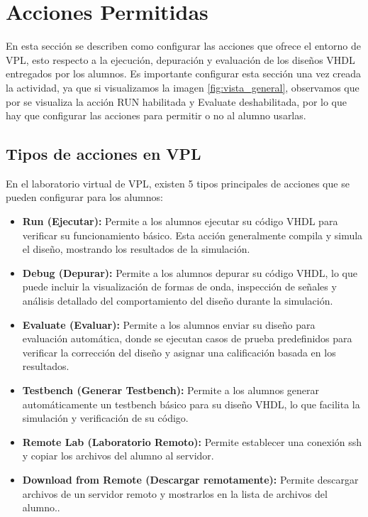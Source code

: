\documentclass[12pt, a4paper, twoside, openany]{book}
\begin{document}
\chapter{Acciones Permitidas}
\label{ch:acciones}
En esta sección se describen como configurar las acciones que ofrece el entorno de VPL, esto respecto a la ejecución, depuración y evaluación de los diseños VHDL entregados por los alumnos.
Es importante configurar esta sección una vez creada la actividad, ya que si visualizamos la imagen \ref{fig:vista_general}, observamos que por se visualiza la acción  RUN habilitada y Evaluate deshabilitada, 
por lo que hay que configurar las  acciones para permitir o no al alumno usarlas.

\section{Tipos de acciones en VPL}
\label{sec:tipos-acciones}
En el laboratorio virtual de VPL, existen 5 tipos principales de acciones  que se pueden configurar para los alumnos:
\begin{itemize}
  \item \textbf{Run (Ejecutar):} Permite a los alumnos ejecutar su código VHDL para verificar su funcionamiento básico. Esta acción generalmente compila y simula el diseño, mostrando los resultados de la simulación.
  \item \textbf{Debug (Depurar):} Permite a los alumnos depurar su código VHDL, lo que puede incluir la visualización de formas de onda, inspección de señales y análisis detallado del comportamiento del diseño durante la simulación.
  \item \textbf{Evaluate (Evaluar):} Permite a los alumnos enviar su diseño para evaluación automática, donde se ejecutan casos de prueba predefinidos para verificar la corrección del diseño y asignar una calificación basada en los resultados. 
  \item \textbf{Testbench (Generar Testbench):} Permite a los alumnos generar automáticamente un testbench básico para su diseño VHDL, lo que facilita la simulación y verificación de su código.
  \item  \textbf{Remote Lab (Laboratorio Remoto):} Permite establecer una conexión ssh y copiar los archivos del alumno al servidor.
  \item  \textbf{Download from Remote  (Descargar remotamente):} Permite descargar archivos de un servidor remoto y mostrarlos en la lista de archivos del alumno..


\end{itemize}
\end{document}
